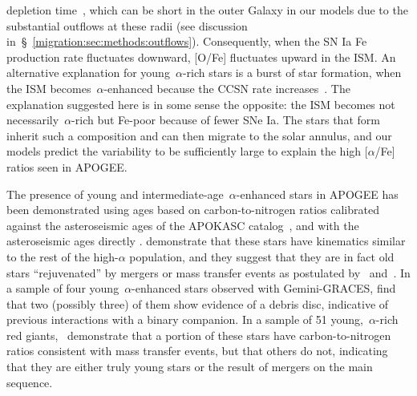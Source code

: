 depletion time~\citep{Weinberg2017b}, which can be short in the outer Galaxy in 
our models due to the substantial outflows at these radii (see discussion 
in~\S~\ref{migration:sec:methods:outflows}). 
Consequently, when the SN Ia Fe production rate fluctuates downward, [O/Fe] 
fluctuates upward in the ISM. 
An alternative explanation for young~$\alpha$-rich stars is a burst of 
star formation, when the ISM becomes~$\alpha$-enhanced because the CCSN rate 
increases~\citep{Johnson2020}. 
The explanation suggested here is in some sense the opposite: the ISM 
becomes not necessarily~$\alpha$-rich but Fe-poor because of fewer SNe Ia. 
The stars that form inherit such a composition and can then migrate to 
the solar annulus, and our models predict the variability to be sufficiently 
large to explain the high [$\alpha$/Fe] ratios seen in APOGEE. 
\par
The presence of young and intermediate-age~$\alpha$-enhanced stars in APOGEE 
has been demonstrated using ages based on carbon-to-nitrogen ratios 
\citep{Martig2016} calibrated against the asteroseismic ages of the APOKASC 
catalog~\citep{Pinsonneault2014}, and with the asteroseismic ages directly 
\citep{Martig2015, Jofre2016, Izzard2018, SilvaAguirre2018}. 
\citet{SilvaAguirre2018} demonstrate that these stars have kinematics similar 
to the rest of the high-$\alpha$ population, and they suggest that they are 
in fact old stars ``rejuvenated'' by mergers or mass transfer events 
as postulated by~\citet{Jofre2016} and~\citet{Izzard2018}. 
In a sample of four young~$\alpha$-enhanced stars observed with Gemini-GRACES, 
\citet{Yong2016} find that two (possibly three) of them show evidence of a 
debris disc, indicative of previous interactions with a binary companion. 
In a sample of 51 young,~$\alpha$-rich red giants,~\citet{Hekker2019} 
demonstrate that a portion of these stars have carbon-to-nitrogen ratios 
consistent with mass transfer events, but that others do not, indicating that 
they are either truly young stars or the result of mergers on the main 
sequence. 

